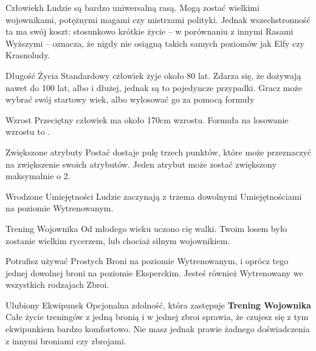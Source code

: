 
\begin{race}{Człowiek}{h}
	Ludzie są bardzo uniwersalną rasą. Mogą zostać wielkimi wojownikami,
	potężnymi magami czy mistrzami polityki. Jednak wszechstronność ta ma swój
	koszt: stosunkowo krótkie życie -- w porównaniu z innymi Rasami Wyższymi --
	oznacza, że nigdy nie osiągną takich samych poziomów jak Elfy czy
	Krasnoludy.

	\vspace{.5cm}

	\begin{trait}{Długość Życia}
		Standardowy człowiek żyje około 80 lat. Zdarza się, że dożywają nawet do
		100 lat, albo i dłużej, jednak są to pojedyncze przypadki. Gracz może
		wybrać swój startowy wiek, albo wylosować go za pomocą formuły
	\end{trait}

	\begin{trait}{Wzrost}
		Przeciętny człowiek ma około 170cm wzrostu. Formuła na losowanie wzrostu
		to .
	\end{trait}

	\begin{trait}{Zwiększone atrybuty}
		Postać dostaje pulę trzech punktów, które może przeznaczyć na
		zwiększenie swoich atrybutów. Jeden atrybut może zostać zwiększony
		maksymalnie o 2.
	\end{trait}

	\begin{trait}{Wrodzone Umiejętności}
		Ludzie zaczynają z trzema dowolnymi Umiejętnościami na poziomie
		Wytrenowanym.
	\end{trait}

	\begin{trait}{Trening Wojownika}
		Od młodego wieku uczono cię walki. Twoim losem było zostanie wielkim
		rycerzem, lub chociaż silnym wojownikiem.

		Potrafisz używać Prostych Broni na poziomie Wytrenowanym, i oprócz tego
		jednej dowolnej broni na poziomie Eksperckim. Jesteś również Wytrenowany
		we wszystkich rodzajach Zbroi.
	\end{trait}

	\begin{trait}{Ulubiony Ekwipunek}
		Opcjonalna zdolność, która zastępuje {\bfseries Trening Wojownika}\\
		Całe życie treningów z jedną bronią i w jednej zbroi sprawia, że czujesz
		się z tym ekwipunkiem bardzo komfortowo. Nie masz jednak prawie żadnego
		doświadczenia z innymi broniami czy zbrojami.


\end{trait}
\end{race}
